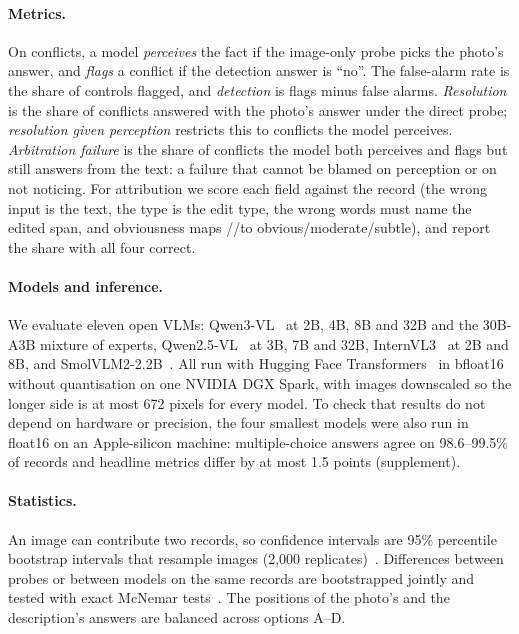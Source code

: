 \paragraph{Metrics.}
On conflicts, a model \emph{perceives} the fact if the image-only probe picks the photo's answer, and \emph{flags} a conflict if the detection answer is ``no''. The false-alarm rate is the share of controls flagged, and \emph{detection} is flags minus false alarms. \emph{Resolution} is the share of conflicts answered with the photo's answer under the direct probe; \emph{resolution given perception} restricts this to conflicts the model perceives. \emph{Arbitration failure} is the share of conflicts the model both perceives and flags but still answers from the text: a failure that cannot be blamed on perception or on not noticing. For attribution we score each field against the record (the wrong input is the text, the type is the edit type, the wrong words must name the edited span, and obviousness maps \Sone/\Stwo/\Sthree to obvious/moderate/subtle), and report the share with all four correct.

\paragraph{Models and inference.}
We evaluate eleven open VLMs: Qwen3-VL~\cite{bai2025qwen3vl} at 2B, 4B, 8B and 32B and the 30B-A3B mixture of experts, Qwen2.5-VL~\cite{bai2025qwen25vl} at 3B, 7B and 32B, InternVL3~\cite{zhu2025internvl3} at 2B and 8B, and SmolVLM2-2.2B~\cite{marafioti2025smolvlm}. All run with Hugging Face Transformers~\cite{wolf2020transformers} in bfloat16 without quantisation on one NVIDIA DGX Spark, with images downscaled so the longer side is at most 672 pixels for every model. To check that results do not depend on hardware or precision, the four smallest models were also run in float16 on an Apple-silicon machine: multiple-choice answers agree on 98.6--99.5\% of records and headline metrics differ by at most 1.5 points (supplement).

\paragraph{Statistics.}
An image can contribute two records, so confidence intervals are 95\% percentile bootstrap intervals that resample images (2,000 replicates)~\cite{efron1979bootstrap}. Differences between probes or between models on the same records are bootstrapped jointly and tested with exact McNemar tests~\cite{mcnemar1947note}. The positions of the photo's and the description's answers are balanced across options A--D.

